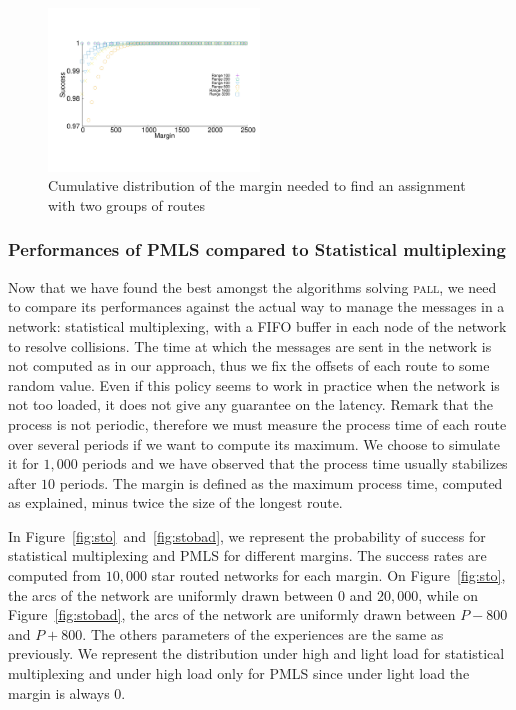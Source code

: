 \documentclass[10pt, conference, letterpaper]{IEEEtran}
\newcommand\pall{\textsc{pall}\xspace}
\begin{document}
                \begin{figure}
       \begin{center}
      \includegraphics[width = 0.5\textwidth]{departs_distrib2Grp.pdf}
      \end{center}
    \caption{Cumulative distribution of the margin needed to find an assignment with two groups of routes}
      \label{fig:2grp}   
     \end{figure}    
     
     
     \subsubsection{Performances of PMLS compared to Statistical multiplexing}
     Now that we have found the best amongst the algorithms solving \pall, we need to compare its performances against the actual way to manage the messages in a network:  statistical multiplexing, with a FIFO buffer in each node of the network to resolve collisions. The time at which the messages are sent in the network is not computed as in our approach, thus we fix the offsets of each route to some random value.
     Even if this policy seems to work in practice when the network is not too loaded, it does not give any guarantee on the latency. Remark that the process is not periodic, therefore we must measure the process time of each route over several periods if we want to compute its maximum. We choose to simulate it for $1,000$ periods and we have observed that the process time usually stabilizes after $10$ periods. The margin is defined as the maximum process time, computed as explained, minus twice the size of the longest route. 
	    
     In Figure~\ref{fig:sto}~and~\ref{fig:stobad}, we represent the probability of success for 
     statistical multiplexing and PMLS for different margins. The success rates are computed from $10,000$ star routed networks for each margin. On Figure~\ref{fig:sto}, the arcs of the network are uniformly drawn between $0$ and $20,000$, while on Figure~\ref{fig:stobad}, the arcs of the network are uniformly drawn between $P-800$ and $P+800$. The others parameters of the experiences are the same as previously. We represent the distribution under high and light load for statistical multiplexing and under high load only for PMLS since under light load the margin is always $0$. 
     
\end{document}
